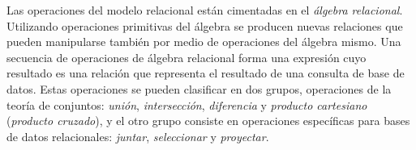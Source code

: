 Las operaciones del modelo relacional están cimentadas en el \emph{álgebra relacional}.
Utilizando operaciones primitivas del álgebra se producen nuevas relaciones que pueden manipularse también por medio de operaciones del álgebra mismo. Una secuencia de operaciones de álgebra relacional forma una expresión cuyo resultado es una relación que representa el resultado de una consulta de base de datos. Estas operaciones se pueden clasificar en dos grupos, operaciones de la teoría de conjuntos: \emph{unión}, \emph{intersección}, \emph{diferencia} y \emph{producto cartesiano} (\emph{producto cruzado}), y el otro grupo consiste en operaciones específicas para bases de datos relacionales: \emph{juntar}, \emph{seleccionar} y \emph{proyectar}.

